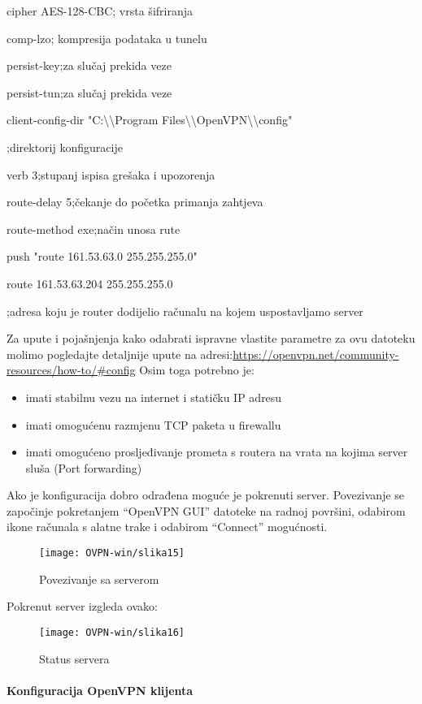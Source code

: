{cipher AES-128-CBC\hfill; vrsta šifriranja

comp-lzo\hfill; kompresija podataka u tunelu

persist-key\hfill;za slučaj prekida veze

persist-tun\hfill;za slučaj prekida veze

client-config-dir "C:\textbackslash \textbackslash Program Files\textbackslash \textbackslash OpenVPN\textbackslash \textbackslash config"\hfill

;direktorij konfiguracije

verb 3\hfill;stupanj ispisa grešaka i upozorenja

route-delay 5\hfill;čekanje do početka primanja zahtjeva

route-method exe\hfill;način unosa rute

push "route 161.53.63.0 255.255.255.0" 

route 161.53.63.204 255.255.255.0\hfill

;adresa koju je router dodijelio računalu na kojem uspostavljamo server
}\bigbreak
Za upute i pojašnjenja kako odabrati ispravne vlastite parametre za ovu datoteku molimo pogledajte detaljnije upute na adresi:\smallbreak \url{https://openvpn.net/community-resources/how-to/\#config}\smallbreak
Osim toga potrebno je:
\begin{itemize}
	\item imati stabilnu vezu na internet i statičku IP adresu
	\item imati omogućenu razmjenu TCP paketa u firewallu
	\item imati omogućeno prosljeđivanje prometa s routera na vrata na kojima server sluša (Port forwarding)
\end{itemize}	
	
Ako je konfiguracija dobro odrađena moguće je pokrenuti server. Povezivanje se započinje pokretanjem ``OpenVPN GUI'' datoteke na radnoj površini, odabirom ikone računala s alatne trake i odabirom ``Connect'' mogućnosti. 
\begin{figure}[h!]
	\centering
     \texttt{[image: OVPN-win/slika15]}
     \caption{Povezivanje sa serverom}
\end{figure}
\FloatBarrier 	
Pokrenut server izgleda ovako:
\begin{figure}[h!]
	\centering
     \texttt{[image: OVPN-win/slika16]}
     \caption{Status servera}
\end{figure}
\FloatBarrier
\newpage
\paragraph*{Konfiguracija OpenVPN klijenta}
\hfill \bigbreak

